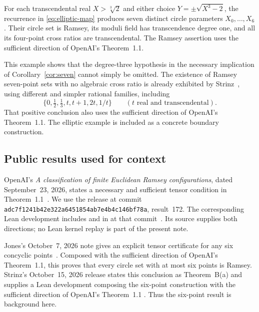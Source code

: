\begin{maintheorem}\label{thm:elliptic}
For each transcendental real $X>\sqrt[3]{2}$ and either choice
$Y=\pm\sqrt{X^3-2}$, the recurrence in
\eqref{eq:elliptic-map} produces seven distinct circle parameters
$X_0,\ldots,X_6$. Their circle set is Ramsey, its moduli field has
transcendence degree one, and all its four-point cross ratios are
transcendental. The Ramsey assertion uses the sufficient direction of
OpenAI's Theorem~1.1.
\end{maintheorem}

This example shows that the degree-three hypothesis in the necessary
implication of Corollary~\ref{cor:seven} cannot simply be omitted.
The existence of Ramsey seven-point sets with no algebraic cross ratio
is already exhibited by Strinz~\cite[Section~7, ``Non-two-group Ramsey
sets'']{strinz2026spherical}, using different and simpler rational
families, including
\[
 \{0,\tfrac12,\tfrac13,t,t+1,2t,1/t\}
 \qquad(t\text{ real and transcendental}).
\]
That positive conclusion also uses the sufficient direction of
OpenAI's Theorem~1.1.
The elliptic example is included as a concrete boundary construction.

\subsection*{Public results used for context}
OpenAI's \emph{A classification of finite Euclidean Ramsey
configurations}, dated September~23, 2026, states a necessary and
sufficient tensor condition in Theorem~1.1~\cite{openai2026}.
We use the release at commit
\texttt{adc7f1241b42e322a6451854ab7e4b4c146bf78a}, result~172.
The corresponding Lean development includes
 and 
in 
at that commit~\cite{openai2026lean}. Its source supplies both
directions; no Lean kernel replay is part of the present note.

Jones's October~7, 2026 note gives an explicit tensor certificate for
any six concyclic points~\cite[Section~2]{jones2026}. Composed with
the sufficient direction of OpenAI's Theorem~1.1, this proves that every circle set with
at most six points is Ramsey. Strinz's October~15, 2026 release states
this conclusion as Theorem~B(a) and supplies a Lean development
composing the six-point construction with the sufficient direction of
OpenAI's Theorem~1.1
\cite{strinz2026spherical}. Thus the six-point result is background
here.

